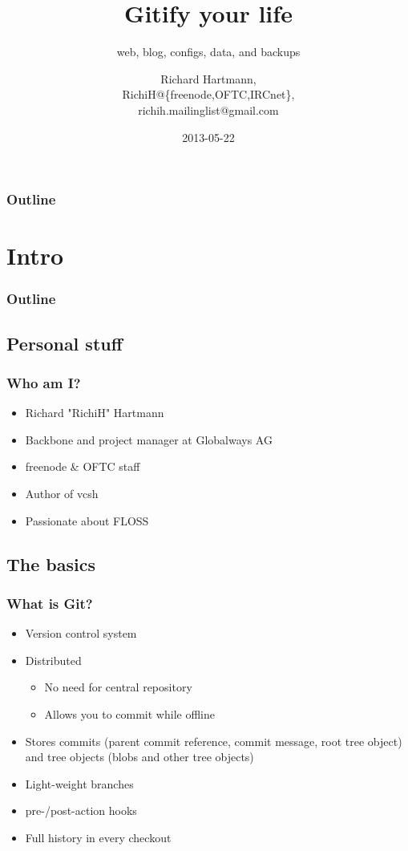 \documentclass[t]{beamer}
\title{Gitify your life}
\subtitle{web, blog, configs, data, and backups}
\author{Richard Hartmann,\\
RichiH@\{freenode,OFTC,IRCnet\},\\
richih.mailinglist@gmail.com}
\date{2013-05-22}
\begin{document}
\setcounter{tocdepth}{1}

\begin{frame}
	\titlepage
\end{frame}

\begin{frame}
	\frametitle{Outline}
	\tableofcontents
\end{frame}


\section{Intro}

\begin{frame}
	\frametitle{Outline}
	\tableofcontents[currentsection]
\end{frame}

\subsection{Personal stuff}

\begin{frame}
	\frametitle{Who am I?}
	\begin{itemize}
		\item Richard "RichiH" Hartmann
		\item Backbone and project manager at Globalways AG
		\item freenode \& OFTC staff
		\item Author of vcsh
		\item Passionate about FLOSS
	\end{itemize}
\end{frame}

\subsection{The basics}

\begin{frame}
	\frametitle{What is Git?}
	\begin{itemize}
		\item Version control system
		\item Distributed
		\begin{itemize}
			\item No need for central repository
			\item Allows you to commit while offline
		\end{itemize}
		\item Stores commits (parent commit reference, commit message, root tree object) and tree objects (blobs and other tree objects)
		\item Light-weight branches
		\item pre-/post-action hooks
		\item Full history in every checkout
	\end{itemize}
\end{frame}
\end{document}
